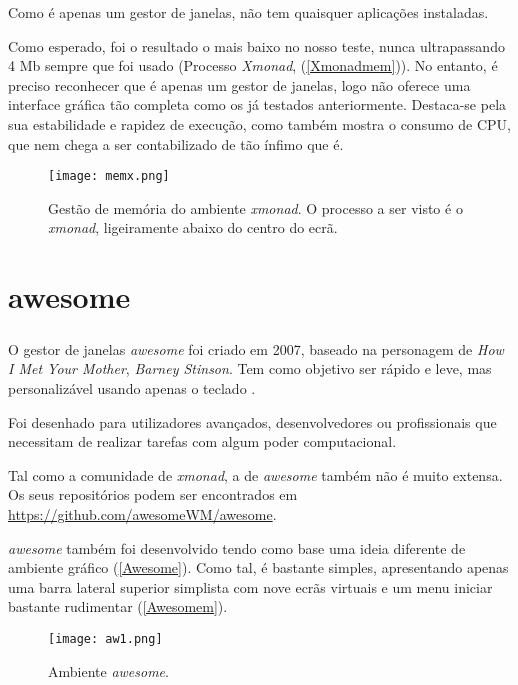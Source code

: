 \documentclass[11pt,openright,twoside]{report}
\begin{document}
Como é apenas um gestor de janelas, não tem quaisquer aplicações instaladas.

Como esperado, foi o resultado o mais baixo no nosso teste, nunca ultrapassando 4 Mb sempre que foi usado (Processo\textit{ Xmonad}, (\autoref{Xmonadmem})). No entanto, é preciso reconhecer que é apenas um gestor de janelas, logo não oferece uma interface gráfica tão completa como os já testados anteriormente. Destaca-se pela sua estabilidade e rapidez de execução, como também mostra o consumo de CPU, que nem chega a ser contabilizado de tão ínfimo que é.

\begin{figure}
 \center
 \texttt{[image: memx.png]}
 \caption{Gestão de memória do ambiente \textit{xmonad}. O processo a ser visto é o\textit{ xmonad}, ligeiramente abaixo do centro do ecrã.}
 \label{Xmonadmem}
\end{figure}

\chapter{awesome}

\paragraph{  }O gestor de janelas \textit{awesome} foi criado em 2007, baseado na personagem de \textit{How I Met Your Mother}, \textit{Barney Stinson}. Tem como objetivo ser rápido e leve, mas personalizável usando apenas o teclado \cite{Awesome}.

Foi desenhado para utilizadores avançados, desenvolvedores ou profissionais que necessitam de realizar tarefas com algum poder computacional.

Tal como a comunidade de \textit{xmonad}, a de \textit{awesome} também não é muito extensa. Os seus repositórios podem ser encontrados em \url{https://github.com/awesomeWM/awesome}.

\textit{awesome} também foi desenvolvido tendo como base uma ideia diferente de ambiente gráfico (\autoref{Awesome}). Como tal, é bastante simples, apresentando apenas uma barra lateral superior simplista com nove ecrãs virtuais e um menu iniciar bastante rudimentar (\autoref{Awesomem}).

\begin{figure}
 \center
 \texttt{[image: aw1.png]}
 \caption{Ambiente\textit{ awesome}.}
 \label{Awesome}
\end{figure}
\end{document}
